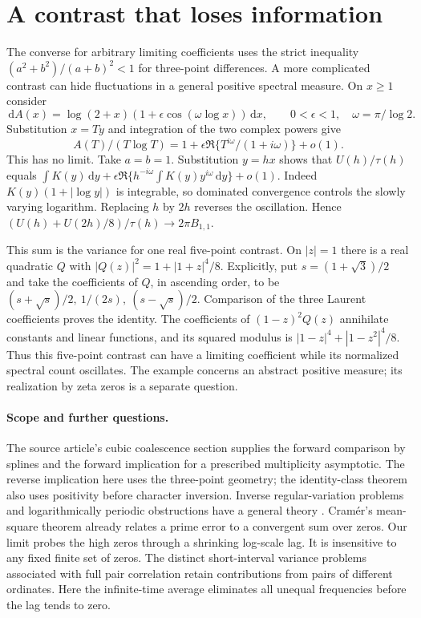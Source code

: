 \documentclass[11pt]{article}
\newcommand{\dd}{\,\mathrm d}
\begin{document}
\section{A contrast that loses information}
The converse for arbitrary limiting coefficients uses the strict inequality $(a^2+b^2)/(a+b)^2<1$ for three-point differences. A more complicated contrast can hide fluctuations in a general positive spectral measure. On $x\ge1$ consider
\[
 \dd A(x)=\log(2+x)(1+\epsilon\cos(\omega\log x))\dd x,
 \qquad 0<\epsilon<1,\quad \omega=\pi/\log2 .
\]
Substitution $x=Ty$ and integration of the two complex powers give
\[
 A(T)/(T\log T)=1+\epsilon\Re\{T^{i\omega}/(1+i\omega)\}+o(1).
\]
This has no limit. Take $a=b=1$. Substitution $y=hx$ shows that $U(h)/\tau(h)$ equals $\int K(y)\dd y+\epsilon\Re\{h^{-i\omega}\int K(y)y^{i\omega}\dd y\}+o(1)$. Indeed $K(y)(1+|\log y|)$ is integrable, so dominated convergence controls the slowly varying logarithm. Replacing $h$ by $2h$ reverses the oscillation. Hence $(U(h)+U(2h)/8)/\tau(h)\to 2\pi B_{1,1}$.

This sum is the variance for one real five-point contrast. On $|z|=1$ there is a real quadratic $Q$ with $|Q(z)|^2=1+|1+z|^4/8$. Explicitly, put $s=(1+\sqrt3)/2$ and take the coefficients of $Q$, in ascending order, to be $(s+\sqrt s)/2,\ 1/(2s),\ (s-\sqrt s)/2$. Comparison of the three Laurent coefficients proves the identity. The coefficients of $(1-z)^2Q(z)$ annihilate constants and linear functions, and its squared modulus is $|1-z|^4+|1-z^2|^4/8$. Thus this five-point contrast can have a limiting coefficient while its normalized spectral count oscillates. The example concerns an abstract positive measure; its realization by zeta zeros is a separate question.

\paragraph{Scope and further questions.}
The source article's cubic coalescence section supplies the forward comparison by splines and the forward implication for a prescribed multiplicity asymptotic. The reverse implication here uses the three-point geometry; the identity-class theorem also uses positivity before character inversion. Inverse regular-variation problems and logarithmically periodic obstructions have a general theory \cite{inverse}. Cram\'er's mean-square theorem \cite{cramer} already relates a prime error to a convergent sum over zeros. Our limit probes the high zeros through a shrinking log-scale lag. It is insensitive to any fixed finite set of zeros. The distinct short-interval variance problems associated with full pair correlation retain contributions from pairs of different ordinates. Here the infinite-time average eliminates all unequal frequencies before the lag tends to zero.
\end{document}
